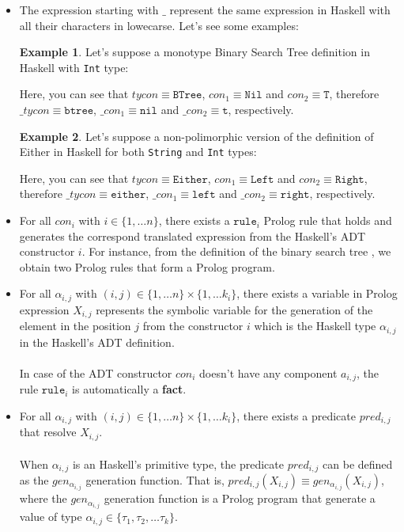 \documentclass{report}
\theoremstyle{definition}
\newtheorem{example}{Example}[section]
\theoremstyle{definition}
\newcommand{\ttt}[1]{\texttt{#1}}
\begin{document}
\begin{itemize}
	\item The expression starting with $\_$ represent the same expression in Haskell with all their characters in lowecarse. Let's see some examples:
	      	      
		\begin{example}
			Let's suppose a monotype Binary Search Tree definition in Haskell with \ttt{Int} type:
			
			Here, you can see that $tycon \equiv \ttt{BTree}$, $con_1 \equiv \ttt{Nil}$ and $con_2 \equiv \ttt{T}$, therefore $\_tycon \equiv \ttt{btree}$, $\_con_1 \equiv \ttt{nil}$ and $\_con_2 \equiv \ttt{t}$, respectively.
		\end{example}
		\begin{example}
			Let's suppose a non-polimorphic version of the definition of Either in Haskell for both \ttt{String} and \ttt{Int} types:
			
			Here, you can see that $tycon \equiv \ttt{Either}$, $con_1 \equiv \ttt{Left}$ and $con_2 \equiv \ttt{Right}$, therefore $\_tycon \equiv \ttt{either}$, $\_con_1 \equiv \ttt{left}$ and $\_con_2 \equiv \ttt{right}$, respectively.
		\end{example}
	      
	\item For all $con_i$ with $i \in \{1, \ldots n \}$, there exists a $\ttt{rule}_i$ Prolog rule that holds and generates the correspond translated expression from the Haskell's ADT constructor $i$. For instance, from the definition of the binary search tree , we obtain two Prolog rules that form a Prolog program.
	\item For all $\alpha_{i,j}$ with $(i,j) \in \{1, \ldots n \} \times \{1, \ldots k_i \}$, there exists a variable in Prolog expression $X_{i,j}$ represents the symbolic variable for the generation of the element in the position $j$ from the constructor $i$ which is the Haskell type $\alpha_{i,j}$ in the Haskell's ADT definition.\\\\
	In case of the ADT constructor $con_i$ doesn't have any component $a_{i,j}$, the rule $\ttt{rule}_i$ is automatically a \textbf{fact}.

	\item For all $\alpha_{i,j}$ with $(i,j) \in \{1, \ldots n \} \times \{1, \ldots k_i \}$, there exists a predicate $pred_{i,j}$ that resolve $X_{i,j}$.\\\\
	When $\alpha_{i,j}$ is an Haskell's primitive type, the predicate $pred_{i,j}$ can be defined as the $gen_{\alpha_{i,j}}$ generation function. That is, $pred_{i,j}(X_{i,j}) \equiv gen_{\alpha_{i,j}}(X_{i,j})$, where the $gen_{\alpha_{i,j}}$ generation function is a Prolog program that generate a value of type $\alpha_{i,j} \in \{ \tau_1 , \tau_2, \ldots \tau_k \}$.

\end{itemize}
\end{document}
